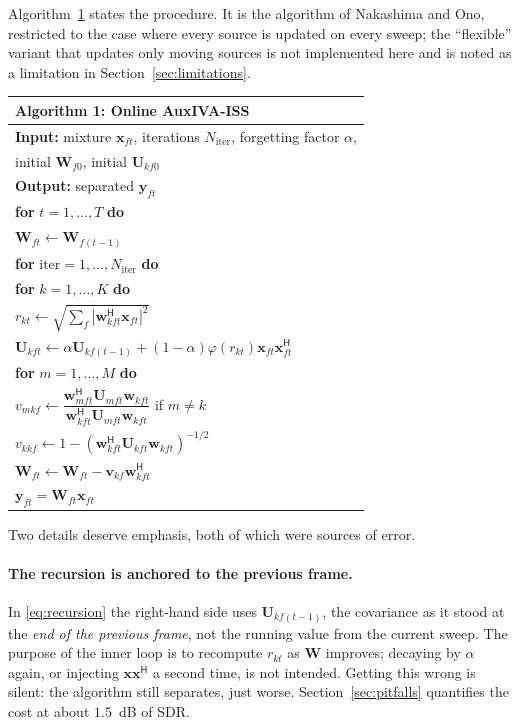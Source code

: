 \documentclass[11pt,a4paper]{article}
\newcommand{\W}{\boldsymbol{W}}
\newcommand{\U}{\boldsymbol{U}}
\newcommand{\x}{\boldsymbol{x}}
\newcommand{\y}{\boldsymbol{y}}
\newcommand{\w}{\boldsymbol{w}}
\newcommand{\vv}{\boldsymbol{v}}
\newcommand{\herm}{^{\mathsf{H}}}
\begin{document}
Algorithm~\ref{alg:iss} states the procedure. It is the algorithm of Nakashima
and Ono, restricted to the case where every source is updated on every sweep;
the ``flexible'' variant that updates only moving sources is not implemented
here and is noted as a limitation in Section~\ref{sec:limitations}.

\begin{table}[t]
\centering
\begin{tabular}{l}
\toprule
\textbf{Algorithm 1:} Online AuxIVA-ISS \\
\midrule
\textbf{Input:} mixture $\x_{ft}$, iterations $N_{\text{iter}}$, forgetting factor $\alpha$, \\
\quad\quad initial $\W_{f0}$, initial $\U_{kf0}$ \\
\textbf{Output:} separated $\y_{ft}$ \\[0.3em]
\textbf{for} $t = 1,\dots,T$ \textbf{do} \\
\quad $\W_{ft} \leftarrow \W_{f(t-1)}$ \\
\quad \textbf{for} $\text{iter} = 1,\dots,N_{\text{iter}}$ \textbf{do} \\
\quad\quad \textbf{for} $k = 1,\dots,K$ \textbf{do} \\
\quad\quad\quad $r_{kt} \leftarrow \sqrt{\sum_f |\w_{kft}\herm \x_{ft}|^2}$ \\
\quad\quad\quad $\U_{kft} \leftarrow \alpha \U_{kf(t-1)} + (1-\alpha)\varphi(r_{kt})\x_{ft}\x_{ft}\herm$ \\
\quad\quad\quad \textbf{for} $m = 1,\dots,M$ \textbf{do} \\
\quad\quad\quad\quad $v_{mkf} \leftarrow
  \dfrac{\w_{mft}\herm \U_{mft}\w_{kft}}{\w_{kft}\herm \U_{mft}\w_{kft}}$ if $m \ne k$ \\
\quad\quad\quad\quad $v_{kkf} \leftarrow 1 - (\w_{kft}\herm \U_{kft}\w_{kft})^{-1/2}$ \\
\quad\quad\quad $\W_{ft} \leftarrow \W_{ft} - \vv_{kf}\w_{kft}\herm$ \\
\quad $\y_{ft} = \W_{ft}\x_{ft}$ \\
\bottomrule
\end{tabular}
\label{alg:iss}
\end{table}

Two details deserve emphasis, both of which were sources of error.

\paragraph{The recursion is anchored to the previous frame.} In
\eqref{eq:recursion} the right-hand side uses $\U_{kf(t-1)}$, the covariance as
it stood at the \emph{end of the previous frame}, not the running value from the
current sweep. The purpose of the inner loop is to recompute $r_{kt}$ as $\W$
improves; decaying by $\alpha$ again, or injecting $\x\x\herm$ a second time, is
not intended. Getting this wrong is silent: the algorithm still separates, just
worse. Section~\ref{sec:pitfalls} quantifies the cost at about $1.5$~dB of SDR.
\end{document}
